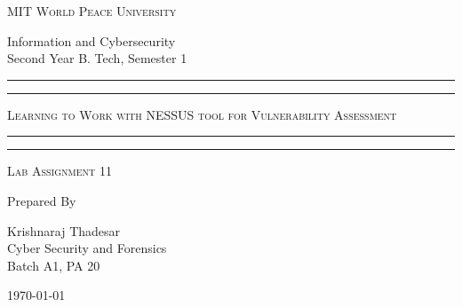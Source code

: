 \documentclass[11pt]{article}
\begin{document}
\begin{titlepage}
    \centering


    \huge\textsc{
        MIT World Peace University
    }\\

    \vspace{0.75\baselineskip} %

    \LARGE{
        Information and Cybersecurity\\
        Second Year B. Tech, Semester 1
    }

    \vfill %


    \rule{\textwidth}{1.6pt}\vspace*{-\baselineskip}\vspace*{2pt}
    \rule{\textwidth}{0.6pt}
    \vspace{0.75\baselineskip} %



    \huge{\textsc{
            Learning to Work with NESSUS tool for Vulnerability Assessment
        }} \\



    \vspace{0.5\baselineskip} %
    \rule{\textwidth}{0.6pt}\vspace*{-\baselineskip}\vspace*{2.8pt}
    \rule{\textwidth}{1.6pt}

    \vspace{1\baselineskip} %


    \LARGE\textsc{
        Lab Assignment 11
    } %
    \vfill


    Prepared By
    \vspace{0.5\baselineskip} %

    \Large{
        Krishnaraj Thadesar \\
        Cyber Security and Forensics\\
        Batch A1, PA 20
    }


    \vspace{0.5\baselineskip} %
    \today

\end{titlepage}
\end{document}
